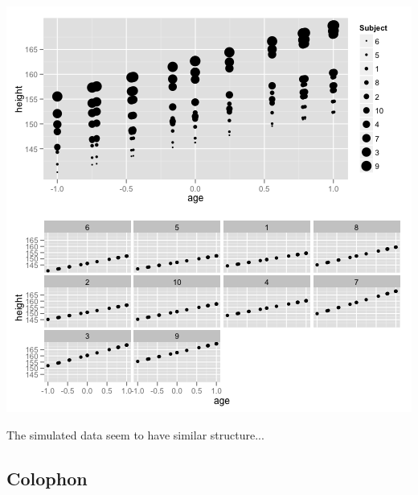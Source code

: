 \documentclass{article}
\makeatletter
\newenvironment{kframe}{%
 \def\FrameCommand##1{\hskip\@totalleftmargin \hskip-\fboxsep
 \colorbox{shadecolor}{##1}\hskip-\fboxsep
     \hskip-\linewidth \hskip-\@totalleftmargin \hskip\columnwidth}%
 \MakeFramed {\advance\hsize-\width
   \@totalleftmargin\z@ \linewidth\hsize
   \@setminipage}}%
 {\par\unskip\endMakeFramed}
\newenvironment{knitrout}{}{} %
\makeatother
\begin{document}
\begin{knitrout}
{\begin{kframe}
\includegraphics{ox-simulate} \end{kframe}}
\end{knitrout}


The simulated data seem to have similar structure... 


\newpage
\subsection*{Colophon}
\end{document}
